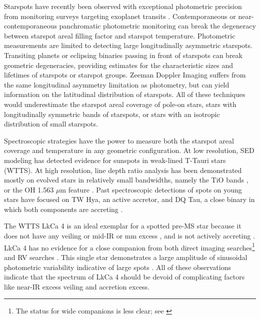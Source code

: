 \documentclass[twocolumn]{emulateapj}%
\newcommand{\name}{LkCa 4 }
\begin{document}


Starspots have recently been observed with exceptional photometric precision from monitoring surveys targeting exoplanet transits \citep[\emph{e.g}][]{harrison11,cody14,davenport15}.  Contemporaneous or near-contemporaneous panchromatic photometric monitoring \citep{bouvier95,grankin07} can break the degeneracy between starspot areal filling factor and starspot temperature. Photometric measurements are limited to detecting large longitudinally asymmetric starspots.  Transiting planets or eclipsing binaries passing in front of starspots \citep{desert11} can break geometric degeneracies, providing estimates for the characteristic sizes and lifetimes of starspots or starspot groups.  Zeeman Doppler Imaging \citep[ZDI]{donati14} suffers from the same longitudinal asymmetry limitation as photometry, but can yield information on the latitudinal distribution of starspots.  All of these techniques would underestimate the starspot areal coverage of pole-on stars, stars with longitudinally symmetric bands of starspots, or stars with an isotropic distribution of small starspots.  

Spectroscopic strategies have the power to measure both the starspot areal coverage and temperature in any geometric configuration.  At low resolution, SED modeling \citep{wolk96} has detected evidence for sunspots in weak-lined T-Tauri stars (WTTS).  At high resolution, line depth ratio analysis has been demonstrated mostly on evolved stars in relatively small bandwidths, namely the TiO bands \citep{neff95,oneal96,oneal98,oneal04}, or the OH 1.563 $\mu$m feature \citep{oneal01}.  Past spectroscopic detections of spots on young stars have focused on TW Hya, an active accretor, and DQ Tau, a close binary in which both components are accreting \citep{debes13,bary14}.  

The WTTS \name \citep{herbig86,strom89a,downes88,strom89b} is an ideal exemplar for a spotted pre-MS star because it does not have any veiling \citep[\emph{e.g.}][]{hartigan95} or mid-IR or mm excess \citep[\emph{e.g.}][]{andrews05,furlan06,buckle15}, and is not actively accreting \citep[\emph{e.g.}][]{edwards06,cauley12}.  LkCa 4 has no evidence for a close companion from both direct imaging searches\citep{karr10,kraus11,daemgen15}\footnote{The status for wide companions is less clear; see \citet{stauffer91,itoh08,kraus09,kraus11,herczeg14}} and RV searches \citep{nguyen12,donati14}.  This single star demonstrates a large amplitude of sinusoidal photometric variability indicative of large spots \citep{grankin08,xiao12}.  All of these observations indicate that the spectrum of \name should be devoid of complicating factors like near-IR excess veiling and accretion excess.    
\end{document}
